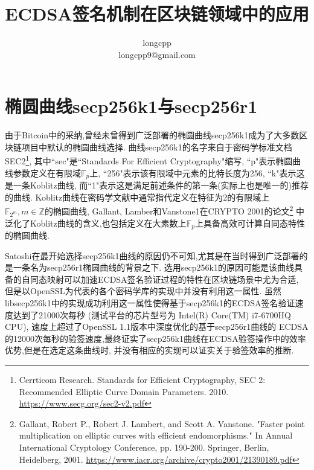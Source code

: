 \documentclass{article}
\newcommand{\Z}{\mathbb{Z}}
\newcommand{\F}{\mathbb{F}}
\begin{document}
\title{ECDSA签名机制在区块链领域中的应用}
\author{longcpp \\ \small{longcpp9@gmail.com}}

\maketitle

\section{椭圆曲线secp256k1与secp256r1}

由于Bitcoin中的采纳,曾经未曾得到广泛部署的椭圆曲线secp256k1成为了大多数区块链项目中默认的椭圆曲线选择.
曲线secp256k1的名字来自于密码学标准文档SEC2\footnote{Cerrticom Research. Standards for Efficient Cryptography, 
SEC 2: Recommended Elliptic Curve Domain Parameters. 2010. \url{https://www.secg.org/sec2-v2.pdf}},
其中``sec"是``Standards For Efficient Cryptography"缩写,
``p"表示椭圆曲线参数定义在有限域$\F_p$上, ``256"表示该有限域中元素的比特长度为256, 
``k"表示这是一条Koblitz曲线, 而``1"表示这是满足前述条件的第一条(实际上也是唯一的)推荐的曲线.
Koblitz曲线在密码学文献中通常指代定义在特征为2的有限域上$\F_{2^m}, m\in\Z$的椭圆曲线,
Gallant, Lamber和Vanstone1在CRYPTO 2001的论文\footnote{
Gallant, Robert P., Robert J. Lambert, and Scott A. Vanstone. "Faster point multiplication on elliptic curves with efficient endomorphisms." In Annual International Cryptology Conference, pp. 190-200. Springer, Berlin, Heidelberg, 2001.
\url{https://www.iacr.org/archive/crypto2001/21390189.pdf}}
中泛化了Koblitz曲线的含义,也包括定义在大素数上$\F_p$上具备高效可计算自同态特性的椭圆曲线.

Satoshi在最开始选择secp256k1曲线的原因仍不可知,尤其是在当时得到广泛部署的是一条名为secp256r1椭圆曲线的背景之下.
选用secp256k1的原因可能是该曲线具备的自同态映射可以加速ECDSA签名验证过程的特性在区块链场景中尤为合适,
但是以OpenSSL为代表的各个密码学库的实现中并没有利用这一属性.
虽然libsecp256k1中的实现成功利用这一属性使得基于secp256k1的ECDSA签名验证速度达到了21000次每秒
(测试平台的芯片型号为 Intel(R) Core(TM) i7-6700HQ CPU), 速度上超过了OpenSSL 1.1版本中深度优化的基于secp256r1曲线的
ECDSA的12000次每秒的验签速度,最终证实了secp256k1曲线在ECDSA验签操作中的效率优势,但是在选定这条曲线时,
并没有相应的实现可以证实关于验签效率的推断.
\end{document}
